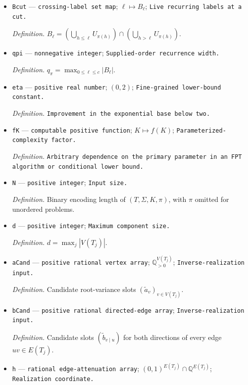 \documentclass{article}
\begin{document}
\begin{itemize}
  \item \texttt{Bcut} --- \texttt{crossing-\allowbreak{}label set map}; \(\ell\mapsto B_\ell\); \texttt{Live recurring labels at a cut.}
  \par\smallskip\noindent\emph{Definition.} \(B_\ell=(\bigcup_{h\le\ell}U_{\pi(h)})\cap(\bigcup_{h>\ell}U_{\pi(h)})\).
  \item \texttt{qpi} --- \texttt{nonnegative integer}; \texttt{Supplied-\allowbreak{}order recurrence width.}
  \par\smallskip\noindent\emph{Definition.} \(q_\pi=\max_{0\le\ell\le c}|B_\ell|\).
  \item \texttt{eta} --- \texttt{positive real number}; \((0,2)\); \texttt{Fine-\allowbreak{}grained lower-\allowbreak{}bound constant.}
  \par\smallskip\noindent\emph{Definition.} \texttt{Improvement in the exponential base below two.}
  \item \texttt{fK} --- \texttt{computable positive function}; \(K\mapsto f(K)\); \texttt{Parameterized-\allowbreak{}complexity factor.}
  \par\smallskip\noindent\emph{Definition.} \texttt{Arbitrary dependence on the primary parameter in an FPT algorithm or conditional lower bound.}
  \item \texttt{N} --- \texttt{positive integer}; \texttt{Input size.}
  \par\smallskip\noindent\emph{Definition.} Binary encoding length of \((T,\Sigma,K,\pi)\), with \(\pi\) omitted for unordered problems.
  \item \texttt{d} --- \texttt{positive integer}; \texttt{Maximum component size.}
  \par\smallskip\noindent\emph{Definition.} \(d=\max_j|V(T_j)|\).
  \item \texttt{aCand} --- \texttt{positive rational vertex array}; \(\mathbb Q_{>0}^{V(T_j)}\); \texttt{Inverse-\allowbreak{}realization input.}
  \par\smallskip\noindent\emph{Definition.} Candidate root-variance slots \((\widetilde a_v)_{v\in V(T_j)}\).
  \item \texttt{bCand} --- \texttt{positive rational directed-\allowbreak{}edge array}; \texttt{Inverse-\allowbreak{}realization input.}
  \par\smallskip\noindent\emph{Definition.} Candidate slots \((\widetilde b_{v\mid u})\) for both directions of every edge \(uv\in E(T_j)\).
  \item \texttt{h} --- \texttt{rational edge-\allowbreak{}attenuation array}; \((0,1)^{E(T_j)}\cap\mathbb Q^{E(T_j)}\); \texttt{Realization coordinate.}

\end{itemize}
\end{document}

